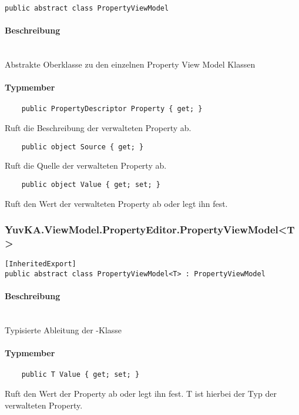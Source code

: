 \begin{verbatim}
public abstract class PropertyViewModel
\end{verbatim}

\paragraph{Beschreibung}~\\
Abstrakte Oberklasse zu den einzelnen Property View Model Klassen

\paragraph{Typmember}
\begin{itemize}
 	
	\begin{verbatim}
	public PropertyDescriptor Property { get; }
	\end{verbatim}
	Ruft die Beschreibung der verwalteten Property ab.

	\begin{verbatim}
	public object Source { get; }
	\end{verbatim}
	Ruft die Quelle der verwalteten Property ab.

	\begin{verbatim}
	public object Value { get; set; }
	\end{verbatim}
	Ruft den Wert der verwalteten Property ab oder legt ihn fest.

\end{itemize}




\subsubsection{YuvKA.ViewModel.PropertyEditor.PropertyViewModel\textless T\textgreater}

\begin{verbatim}
[InheritedExport]
public abstract class PropertyViewModel<T> : PropertyViewModel
\end{verbatim}

\paragraph{Beschreibung}~\\
Typisierte Ableitung der -Klasse

\paragraph{Typmember}
\begin{itemize}

	\begin{verbatim}
	public T Value { get; set; }
	\end{verbatim}
	Ruft den Wert der Property ab oder legt ihn fest. T ist hierbei der Typ der verwalteten Property.
\end{itemize}



